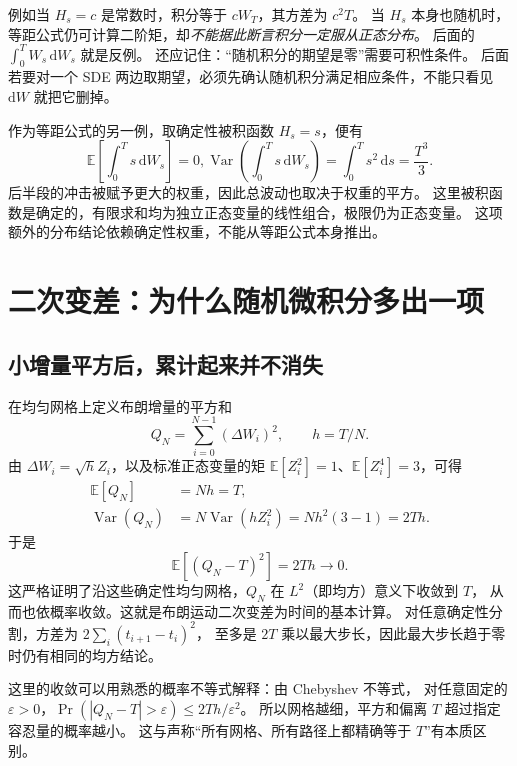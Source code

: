 \documentclass[11pt,a4paper,fontset=none]{ctexart}
\numberwithin{equation}{section}
\newcommand{\E}{\mathbb E}
\DeclareMathOperator{\Var}{Var}
\begin{document}
例如当 $H_s=c$ 是常数时，积分等于 $cW_T$，其方差为 $c^2T$。
当 $H_s$ 本身也随机时，等距公式仍可计算二阶矩，却\emph{不能据此断言积分一定服从正态分布}。
后面的 $\int_0^T W_s\,\mathrm dW_s$ 就是反例。
还应记住：“随机积分的期望是零”需要可积性条件。
后面若要对一个 SDE 两边取期望，必须先确认随机积分满足相应条件，不能只看见 $\mathrm dW$ 就把它删掉。

作为等距公式的另一例，取确定性被积函数 $H_s=s$，便有
\begin{equation}
  \E\!\left[\int_0^T s\,\mathrm dW_s\right]=0,
  \Var\!\left(\int_0^T s\,\mathrm dW_s\right)
  =\int_0^T s^2\,\mathrm ds=\frac{T^3}{3}.
  \label{bg:eq:deterministic-integrand}
\end{equation}
后半段的冲击被赋予更大的权重，因此总波动也取决于权重的平方。
这里被积函数是确定的，有限求和均为独立正态变量的线性组合，极限仍为正态变量。
这项额外的分布结论依赖确定性权重，不能从等距公式本身推出。

\section{二次变差：为什么随机微积分多出一项}
\label{bg:sec:quadratic-variation}

\subsection{小增量平方后，累计起来并不消失}
\label{bg:sub:qv-calculation}

在均匀网格上定义布朗增量的平方和
\begin{equation}
  Q_N=\sum_{i=0}^{N-1}(\Delta W_i)^2,
  \qquad h=T/N.
  \label{bg:eq:qv-sum}
\end{equation}
由 $\Delta W_i=\sqrt h Z_i$，以及标准正态变量的矩
$\E[Z_i^2]=1$、$\E[Z_i^4]=3$，可得
\begin{align}
  \E[Q_N]&=Nh=T,\label{bg:eq:qv-mean}\\
  \Var(Q_N)&=N\Var(hZ_i^2)
   =Nh^2(3-1)=2Th.\label{bg:eq:qv-variance}
\end{align}
于是
\begin{equation}
  \E[(Q_N-T)^2]=2Th\longrightarrow0.
  \label{bg:eq:qv-limit}
\end{equation}
这严格证明了沿这些确定性均匀网格，$Q_N$ 在 $L^2$（即均方）意义下收敛到 $T$，
从而也依概率收敛。这就是布朗运动二次变差为时间的基本计算。
对任意确定性分割，方差为 $2\sum_i(t_{i+1}-t_i)^2$，
至多是 $2T$ 乘以最大步长，因此最大步长趋于零时仍有相同的均方结论。

这里的收敛可以用熟悉的概率不等式解释：由 Chebyshev 不等式，
对任意固定的 $\varepsilon>0$，$\Pr(|Q_N-T|>\varepsilon)\leq 2Th/\varepsilon^2$。
所以网格越细，平方和偏离 $T$ 超过指定容忍量的概率越小。
这与声称“所有网格、所有路径上都精确等于 $T$”有本质区别。
\end{document}
